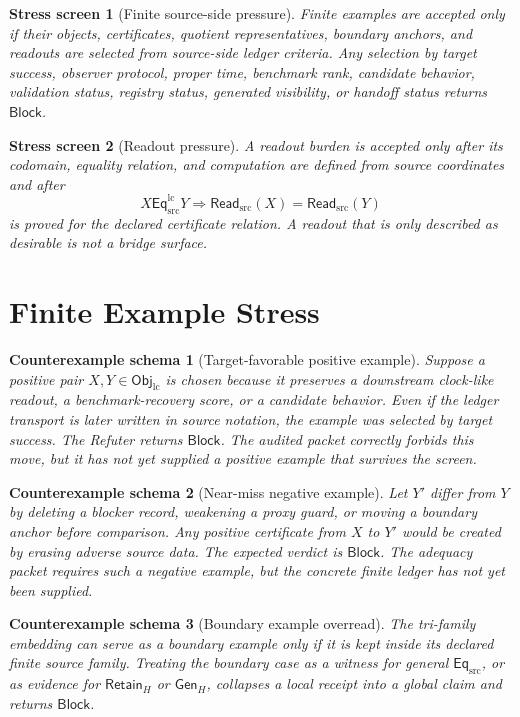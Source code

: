 \documentclass[11pt]{article}
\newcommand{\EqSrc}{\mathsf{Eq}_{\mathrm{src}}}
\newcommand{\EqLC}{\mathsf{Eq}_{\mathrm{src}}^{\mathrm{lc}}}
\newcommand{\ObjLC}{\mathsf{Obj}_{\mathrm{lc}}}
\newcommand{\ReadSrc}{\mathsf{Read}_{\mathrm{src}}}
\newcommand{\RetainH}{\mathsf{Retain}_{H}}
\newcommand{\GenH}{\mathsf{Gen}_{H}}
\newcommand{\Block}{\mathsf{Block}}
\newtheorem{stressscreen}{Stress screen}
\newtheorem{counterexample}{Counterexample schema}
\begin{document}
\begin{stressscreen}[Finite source-side pressure]
Finite examples are accepted only if their objects, certificates,
quotient representatives, boundary anchors, and readouts are selected
from source-side ledger criteria. Any selection by target success,
observer protocol, proper time, benchmark rank, candidate behavior,
validation status, registry status, generated visibility, or handoff
status returns \(\Block\).
\end{stressscreen}

\begin{stressscreen}[Readout pressure]
A readout burden is accepted only after its codomain, equality relation,
and computation are defined from source coordinates and after
\[
    X\EqLC Y \Longrightarrow \ReadSrc(X)=\ReadSrc(Y)
\]
is proved for the declared certificate relation. A readout that is only
described as desirable is not a bridge surface.
\end{stressscreen}

\section{Finite Example Stress}

\begin{counterexample}[Target-favorable positive example]
Suppose a positive pair \(X,Y\in\ObjLC\) is chosen because it preserves
a downstream clock-like readout, a benchmark-recovery score, or a
candidate behavior. Even if the ledger transport is later written in
source notation, the example was selected by target success. The
Refuter returns \(\Block\). The audited packet correctly forbids this
move, but it has not yet supplied a positive example that survives the
screen.
\end{counterexample}

\begin{counterexample}[Near-miss negative example]
Let \(Y'\) differ from \(Y\) by deleting a blocker record, weakening a
proxy guard, or moving a boundary anchor before comparison. Any positive
certificate from \(X\) to \(Y'\) would be created by erasing adverse
source data. The expected verdict is \(\Block\). The adequacy packet
requires such a negative example, but the concrete finite ledger has not
yet been supplied.
\end{counterexample}

\begin{counterexample}[Boundary example overread]
The tri-family embedding can serve as a boundary example only if it is
kept inside its declared finite source family. Treating the boundary
case as a witness for general \(\EqSrc\), or as evidence for
\(\RetainH\) or \(\GenH\), collapses a local receipt into a global
claim and returns \(\Block\).
\end{counterexample}
\end{document}
